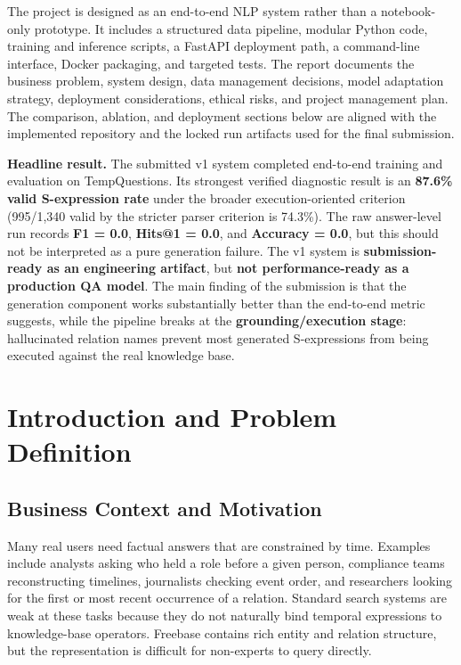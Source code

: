 \documentclass[a4paper,11pt]{article}
\begin{document}
The project is designed as an end-to-end NLP system rather than a notebook-only prototype. It includes a structured data pipeline, modular Python code, training and inference scripts, a FastAPI deployment path, a command-line interface, Docker packaging, and targeted tests. The report documents the business problem, system design, data management decisions, model adaptation strategy, deployment considerations, ethical risks, and project management plan. The comparison, ablation, and deployment sections below are aligned with the implemented repository and the locked run artifacts used for the final submission.

\noindent\textbf{Headline result.} The submitted v1 system completed end-to-end training and evaluation on TempQuestions. Its strongest verified diagnostic result is an \textbf{87.6\% valid S-expression rate} under the broader execution-oriented criterion (995/1,340 valid by the stricter parser criterion is 74.3\%). The raw answer-level run records \textbf{F1 = 0.0}, \textbf{Hits@1 = 0.0}, and \textbf{Accuracy = 0.0}, but this should not be interpreted as a pure generation failure. The v1 system is \textbf{submission-ready as an engineering artifact}, but \textbf{not performance-ready as a production QA model}. The main finding of the submission is that the generation component works substantially better than the end-to-end metric suggests, while the pipeline breaks at the \textbf{grounding/execution stage}: hallucinated relation names prevent most generated S-expressions from being executed against the real knowledge base.

\section{Introduction and Problem Definition}

\subsection{Business Context and Motivation}

Many real users need factual answers that are constrained by time. Examples include analysts asking who held a role before a given person, compliance teams reconstructing timelines, journalists checking event order, and researchers looking for the first or most recent occurrence of a relation. Standard search systems are weak at these tasks because they do not naturally bind temporal expressions to knowledge-base operators. Freebase contains rich entity and relation structure, but the representation is difficult for non-experts to query directly.
\end{document}
